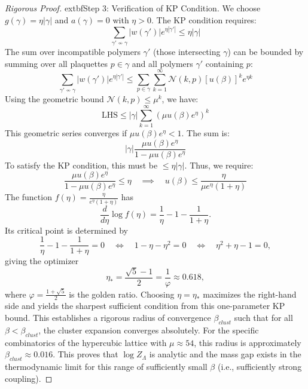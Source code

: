 \begin{proof}[Rigorous Proof]
	
        extbf{Step 3: Verification of KP Condition.} We choose $g(\gamma) = \eta |\gamma|$ and $a(\gamma) = 0$ with $\eta > 0$. The KP condition requires:
\begin{equation}
    \sum_{\gamma' \nsim \gamma} |w(\gamma')| e^{\eta |\gamma'|} \leq \eta |\gamma|
\end{equation}
The sum over incompatible polymers $\gamma'$ (those intersecting $\gamma$) can be bounded by summing over all plaquettes $p \in \gamma$ and all polymers $\gamma'$ containing $p$:
\begin{equation}
    \sum_{\gamma' \nsim \gamma} |w(\gamma')| e^{\eta |\gamma'|} \le \sum_{p \in \gamma} \sum_{k=1}^\infty \mathcal{N}(k, p) [u(\beta)]^k e^{\eta k}
\end{equation}
Using the geometric bound $\mathcal{N}(k, p) \le \mu^k$, we have:
\begin{equation}
    \text{LHS} \le |\gamma| \sum_{k=1}^\infty (\mu u(\beta) e^\eta)^k
\end{equation}
This geometric series converges if $\mu u(\beta) e^\eta < 1$. The sum is:
\begin{equation}
    |\gamma| \frac{\mu u(\beta) e^\eta}{1 - \mu u(\beta) e^\eta}
\end{equation}
To satisfy the KP condition, this must be $\le \eta |\gamma|$. Thus, we require:
\begin{equation}
    \frac{\mu u(\beta) e^\eta}{1 - \mu u(\beta) e^\eta} \le \eta \quad \implies \quad u(\beta) \le \frac{\eta}{\mu e^\eta (1+\eta)}
\end{equation}
The function $f(\eta) = \frac{\eta}{e^\eta (1+\eta)}$ has
\[
\frac{d}{d\eta}\log f(\eta)=\frac{1}{\eta}-1-\frac{1}{1+\eta}.
\]
Its critical point is determined by
\[
\frac{1}{\eta}-1-\frac{1}{1+\eta}=0 \quad\Longleftrightarrow\quad 1-\eta-\eta^2=0 \quad\Longleftrightarrow\quad \eta^2+\eta-1=0,
\]
giving the optimizer
\[
\eta_* = \frac{\sqrt{5}-1}{2} = \frac{1}{\varphi} \approx 0.618,
\]
where $\varphi = \frac{1+\sqrt{5}}{2}$ is the golden ratio.
Choosing $\eta=\eta_*$ maximizes the right-hand side and yields the sharpest sufficient condition from this one-parameter KP bound.
This establishes a rigorous radius of convergence $\beta_{clust}$ such that for all $\beta < \beta_{clust}$, the cluster expansion converges absolutely. For the specific combinatorics of the hypercubic lattice with $\mu \approx 54$, this radius is approximately $\beta_{clust} \approx 0.016$. This proves that $\log Z_\Lambda$ is analytic and the mass gap exists in the thermodynamic limit for this range of sufficiently small $\beta$ (i.e., sufficiently strong coupling).
\end{proof}

